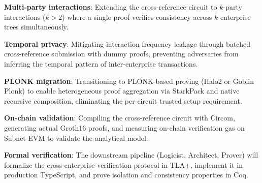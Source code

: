 \textbf{Multi-party interactions}: Extending the cross-reference circuit to
$k$-party interactions ($k > 2$) where a single proof verifies consistency
across $k$ enterprise trees simultaneously.

\textbf{Temporal privacy}: Mitigating interaction frequency leakage through
batched cross-reference submission with dummy proofs, preventing adversaries
from inferring the temporal pattern of inter-enterprise transactions.

\textbf{PLONK migration}: Transitioning to PLONK-based proving (Halo2 or
Goblin Plonk) to enable heterogeneous proof aggregation via StarkPack and
native recursive composition, eliminating the per-circuit trusted setup
requirement.

\textbf{On-chain validation}: Compiling the cross-reference circuit with
Circom, generating actual Groth16 proofs, and measuring on-chain verification
gas on Subnet-EVM to validate the analytical model.

\textbf{Formal verification}: The downstream pipeline (Logicist, Architect,
Prover) will formalize the cross-enterprise verification protocol in TLA+,
implement it in production TypeScript, and prove isolation and consistency
properties in Coq.
